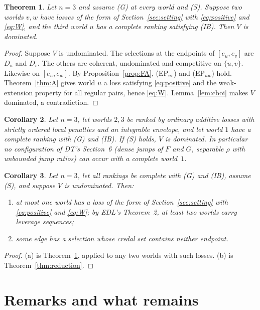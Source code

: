 \documentclass[11pt]{article}
\newtheorem{theorem}{Theorem}
\newtheorem{corollary}[theorem]{Corollary}
\theoremstyle{definition}\newtheorem{definition}[theorem]{Definition}
\theoremstyle{remark}\newtheorem{remark}[theorem]{Remark}
\begin{document}
\begin{theorem}\label{thm:two}
Let $n=3$ and assume (G) at every world and (S). Suppose two worlds $v,w$
have losses of the form of Section~\ref{sec:setting} with
\eqref{eq:positive} and \eqref{eq:W}, and the third world $u$ has a complete
ranking satisfying (IB). Then $V$ is dominated.
\end{theorem}
\begin{proof}
Suppose $V$ is undominated. The selections at the endpoints of $[e_u,e_v]$
are $D_u$ and $D_v$. The others are coherent, undominated and competitive on
$\{u,v\}$. Likewise on $[e_u,e_w]$. By Proposition~\ref{prop:FA}, (EP$_{uv}$)
and (EP$_{uw}$) hold.
Theorem~\ref{thm:A} gives world $u$ a loss satisfying \eqref{eq:positive} and
the weak-extension property for all regular pairs, hence \eqref{eq:W}.
Lemma~\ref{lem:cboi} makes $V$ dominated, a contradiction.
\end{proof}

\begin{corollary}\label{cor:SH}
Let $n=3$, let worlds $2,3$ be ranked by ordinary additive losses with
strictly ordered local penalties and an integrable envelope, and let world
$1$ have a complete ranking with (G) and (IB). If (S) holds, $V$ is
dominated. In particular no configuration of DT's Section~6 (dense jumps of
$F$ and $G$, separable $\rho$ with unbounded jump ratios) can occur with a
complete world~$1$.
\end{corollary}

\begin{corollary}\label{cor:shape}
Let $n=3$, let all rankings be complete with (G) and (IB), assume (S), and
suppose $V$ is undominated. Then:
\begin{enumerate}[label=(\alph*)]
\item at most one world has a loss of the form of
Section~\ref{sec:setting} with \eqref{eq:positive} and \eqref{eq:W}; by EDL's
Theorem~2, at least two worlds carry leverage sequences;
\item some edge has a selection whose credal set contains neither endpoint.
\end{enumerate}
\end{corollary}
\begin{proof}
(a) is Theorem~\ref{thm:two}, applied to any two worlds with such losses.
(b) is Theorem~\ref{thm:reduction}.
\end{proof}

\section{Remarks and what remains}\label{sec:remarks}
\end{document}
